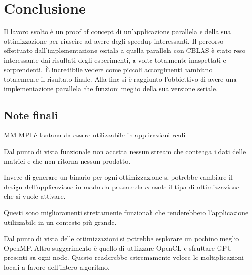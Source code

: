 \chapter{Conclusione}

Il lavoro svolto \`{e} un proof of concept di un'applicazione parallela e della sua ottimizzazione per riuscire ad avere degli speedup interessanti. Il percorso effettuato dall'implementazione seriala a quella parallela con CBLAS \`{e} stato reso interessante dai risultati degli esperimenti, a volte totalmente inaspettati e sorprendenti.
\`{E} incredibile vedere come piccoli accorgimenti cambiano totalemente il risultato finale. Alla fine si \`{e} raggiunto l'obbiettivo di avere una implementazione parallela che funzioni meglio della sua versione seriale.

\section{Note finali}

MM MPI \`{e} lontana da essere utilizzabile in applicazioni reali.

Dal punto di vista funzionale non accetta nessun stream che contenga i dati delle matrici e che non ritorna nessun prodotto.

Invece di generare un binario per ogni ottimizzazione si potrebbe cambiare il design dell'applicazione in modo da passare da console il tipo di ottimizzazione che si vuole attivare.

Questi sono miglioramenti strettamente funzionali che renderebbero l'applicazione utilizzabile in un contesto pi\`{u} grande.

Dal punto di vista delle ottimizzazioni si potrebbe esplorare un pochino meglio OpenMP. Altro suggerimento \`{e} quello di utilizzare OpenCL e sfruttare GPU presenti su ogni nodo. Questo renderebbe estremamente veloce le moltiplicazioni locali a favore dell'intero algoritmo.


